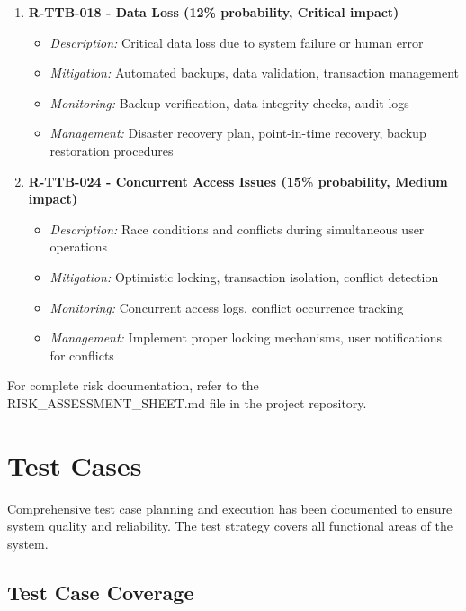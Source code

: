 \begin{enumerate}[leftmargin=*]
    \item \textbf{R-TTB-018 - Data Loss (12\% probability, Critical impact)}
    \begin{itemize}
        \item \textit{Description:} Critical data loss due to system failure or human error
        \item \textit{Mitigation:} Automated backups, data validation, transaction management
        \item \textit{Monitoring:} Backup verification, data integrity checks, audit logs
        \item \textit{Management:} Disaster recovery plan, point-in-time recovery, backup restoration procedures
    \end{itemize}
    
    \item \textbf{R-TTB-024 - Concurrent Access Issues (15\% probability, Medium impact)}
    \begin{itemize}
        \item \textit{Description:} Race conditions and conflicts during simultaneous user operations
        \item \textit{Mitigation:} Optimistic locking, transaction isolation, conflict detection
        \item \textit{Monitoring:} Concurrent access logs, conflict occurrence tracking
        \item \textit{Management:} Implement proper locking mechanisms, user notifications for conflicts
    \end{itemize}
\end{enumerate}

For complete risk documentation, refer to the RISK\_ASSESSMENT\_SHEET.md file in the project repository.

\section{Test Cases}

Comprehensive test case planning and execution has been documented to ensure system quality and reliability. The test strategy covers all functional areas of the system.

\subsection{Test Case Coverage}

